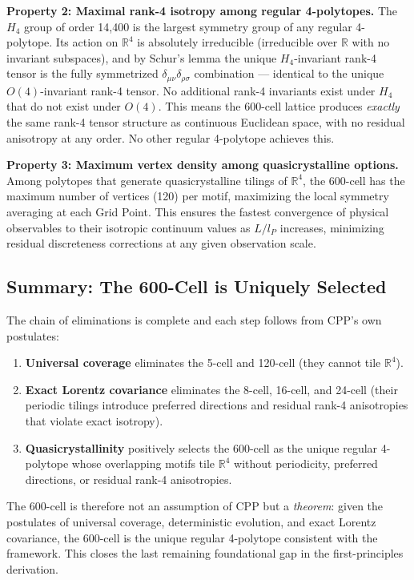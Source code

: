 \documentclass[11pt,letterpaper]{article}
\begin{document}
\textbf{Property 2: Maximal rank-4 isotropy among regular 4-polytopes.}
The $H_4$ group of order 14,400 is the largest symmetry group of any regular 4-polytope. Its action on $\mathbb{R}^4$ is absolutely irreducible (irreducible over $\mathbb{R}$ with no invariant subspaces), and by Schur's lemma the unique $H_4$-invariant rank-4 tensor is the fully symmetrized $\delta_{\mu\nu}\delta_{\rho\sigma}$ combination — identical to the unique $O(4)$-invariant rank-4 tensor. No additional 
rank-4 invariants exist under $H_4$ that do not exist under $O(4)$. This means the 600-cell lattice produces \emph{exactly} the same rank-4 tensor structure as continuous Euclidean space, with no residual anisotropy at any order. No other regular 4-polytope achieves this.

\textbf{Property 3: Maximum vertex density among quasicrystalline options.}
Among polytopes that generate quasicrystalline tilings of $\mathbb{R}^4$, the 600-cell has the maximum number of vertices (120) per motif, maximizing the local symmetry averaging at each Grid Point. This ensures the fastest convergence of physical observables to their isotropic 
continuum values as $L/l_P$ increases, minimizing residual discreteness corrections at any given observation scale.

\subsection{Summary: The 600-Cell is Uniquely Selected}

The chain of eliminations is complete and each step follows from CPP's own postulates:

\begin{enumerate}
\item \textbf{Universal coverage} eliminates the 5-cell and 120-cell (they cannot tile $\mathbb{R}^4$).
\item \textbf{Exact Lorentz covariance} eliminates the 8-cell, 16-cell, and 24-cell (their periodic tilings introduce preferred directions and residual rank-4 anisotropies that violate exact isotropy).
\item \textbf{Quasicrystallinity} positively selects the 600-cell as the unique regular 4-polytope whose overlapping motifs tile $\mathbb{R}^4$ without periodicity, preferred directions, or residual rank-4 anisotropies.
\end{enumerate}

The 600-cell is therefore not an assumption of CPP but a \emph{theorem}: 
given the postulates of universal coverage, deterministic evolution, and exact Lorentz covariance, the 600-cell is the unique regular 4-polytope consistent with the framework. This closes the last remaining foundational gap in the first-principles derivation.
\end{document}
